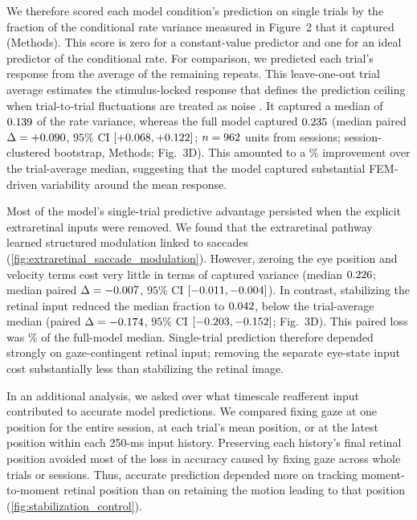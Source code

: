 \documentclass{lite}
\begin{document}
We therefore scored each model condition's prediction on single trials by the fraction of the conditional rate variance measured in Figure~2 that it captured (Methods). This score is zero for a constant-value predictor and one for an ideal predictor of the conditional rate. For comparison, we predicted each trial's response from the average of the remaining repeats. This leave-one-out trial average estimates the stimulus-locked response that defines the prediction ceiling when trial-to-trial fluctuations are treated as noise \cite{schoppe2016measuring}. It captured a median of $0.139$ of the rate variance, whereas the full model captured $0.235$ (median paired $\Delta = +0.090$, $95\%$ CI $[+0.068, +0.122]$; $n = 962$ units from \FigThreeSessions{} sessions; session-clustered bootstrap, Methods; Fig.~3D). This amounted to a \FigThreeDGainPercent\% improvement over the trial-average median, suggesting that the model captured substantial FEM-driven variability around the mean response.

Most of the model's single-trial predictive advantage persisted when the explicit extraretinal inputs were removed. We found that the extraretinal pathway learned structured modulation linked to saccades (\ref{fig:extraretinal_saccade_modulation}). However, zeroing the eye position and velocity terms cost very little in terms of captured variance (median $0.226$; median paired $\Delta = -0.007$, $95\%$ CI $[-0.011, -0.004]$). In contrast, stabilizing the retinal input reduced the median fraction to $0.042$, below the trial-average median (paired $\Delta = -0.174$, $95\%$ CI $[-0.203, -0.152]$; Fig.~3D). This paired loss was \FigThreeDLossPercent\% of the full-model median. Single-trial prediction therefore depended strongly on gaze-contingent retinal input; removing the separate eye-state input cost substantially less than stabilizing the retinal image.

In an additional analysis, we asked over what timescale reafferent input contributed to accurate model predictions. We compared fixing gaze at one position for the entire session, at each trial's mean position, or at the latest position within each 250-ms input history. Preserving each history's final retinal position avoided most of the loss in accuracy caused by fixing gaze across whole trials or sessions. Thus, accurate prediction depended more on tracking moment-to-moment retinal position than on retaining the motion leading to that position (\ref{fig:stabilization_control}).
\end{document}
